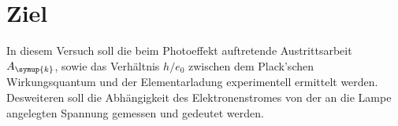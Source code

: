 \section{Ziel}
\label{sec:Ziel}
In diesem Versuch soll die beim Photoeffekt auftretende Austrittsarbeit $A_{\symup{k}}$,
sowie das Verhältnis $h/e_0$ zwischen dem  Plack'schen Wirkungsquantum und
der Elementarladung experimentell ermittelt werden. Desweiteren soll die Abhängigkeit
des Elektronenstromes von der an die Lampe angelegten Spannung gemessen und gedeutet werden.
